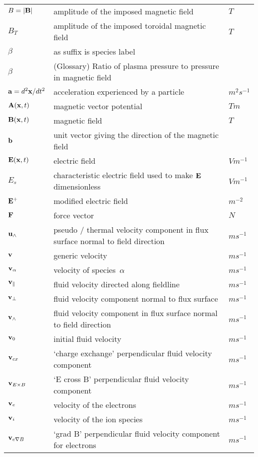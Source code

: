\begin{longtable}{|p{3.0cm}|p{10.0cm}|p{3.0cm}|}
$B=|{\bf B}|$ & amplitude of the imposed magnetic field  &  $T$  \\
$B_T$ & amplitude of the imposed toroidal magnetic field  &  $T$ \\
$\beta$ & as suffix is species label & \\
$\beta$ & (Glossary) Ratio of plasma pressure to pressure in magnetic field &  \\
${\bf a} = d^2 {\bf x}/dt^2$ & acceleration experienced by a particle  &  $m^2 s^{-1}$ \\
${\bf A}({\bf x},t)$ & magnetic vector potential   &  $T m$ \\
${\bf B}({\bf x},t)$ & magnetic field  &  $T$ \\
${\bf b}$ & unit vector giving the direction of the magnetic field & \\
${\bf E}({\bf x},t)$ & electric field  &  $V m^{-1}$ \\
$E_s$ & characteristic electric field used to make ${\bf E}$ dimensionless  &  $V m^{-1}$ \\
${\bf E}^{+}$ & modified electric field  &  $m^{-2}$ \\
${\bf F}$ & force vector  &  $N$ \\
${\bf u}_\wedge$ & pseudo / thermal velocity component in flux surface normal to field direction  &  $m s^{-1}$ \\
${\bf v}$ & generic velocity  &  $m s^{-1}$ \\
${\bf v}_\alpha$ & velocity of species~$\alpha$  &  $m s^{-1}$ \\
${\bf v}_{\|}$ & fluid velocity directed along fieldline  &  $m s^{-1}$ \\
${\bf v}_\perp$ & fluid velocity component normal to flux surface  &  $m s^{-1}$ \\
${\bf v}_\wedge$ & fluid velocity component in flux surface normal to field direction  &  $m s^{-1}$ \\
${\bf v}_0$ & initial fluid velocity  &  $m s^{-1}$ \\
${\bf v}_{cx}$ & `charge exchange' perpendicular fluid velocity component  &  $m s^{-1}$ \\
${\bf v}_{E \times B}$ & `E cross B' perpendicular fluid velocity component  &  $m s^{-1}$ \\
${\bf v}_e$ & velocity of the electrons  &  $m s^{-1}$ \\
${\bf v}_i$ & velocity of the ion species  &  $m s^{-1}$ \\
${\bf v}_{e \nabla B}$ & `grad B' perpendicular fluid velocity component for electrons  &  $m s^{-1}$ \\

\end{longtable}
